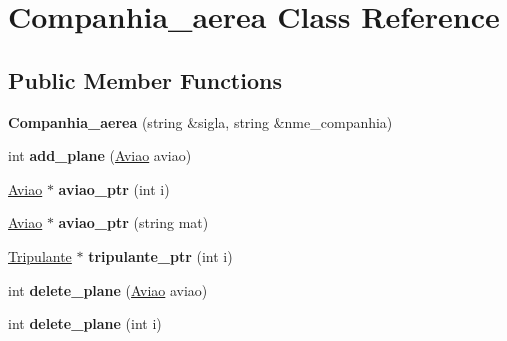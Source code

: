 \hypertarget{class_companhia__aerea}{
\section{Companhia\_\-aerea Class Reference}
\label{class_companhia__aerea}
}
\subsection*{Public Member Functions}
\begin{DoxyCompactItemize}
\item 
\hypertarget{class_companhia__aerea_a0e93c63117e0ee07c3b314e0c9b16b4c}{
{\bfseries Companhia\_\-aerea} (string \&sigla, string \&nme\_\-companhia)}
\label{class_companhia__aerea_a0e93c63117e0ee07c3b314e0c9b16b4c}

\item 
\hypertarget{class_companhia__aerea_accfe05a90387251cacb3c255d6fcb78b}{
int {\bfseries add\_\-plane} (\hyperlink{class_aviao}{Aviao} aviao)}
\label{class_companhia__aerea_accfe05a90387251cacb3c255d6fcb78b}

\item 
\hypertarget{class_companhia__aerea_a2570034f03fbb7f887db82d5c0796b98}{
\hyperlink{class_aviao}{Aviao} $\ast$ {\bfseries aviao\_\-ptr} (int i)}
\label{class_companhia__aerea_a2570034f03fbb7f887db82d5c0796b98}

\item 
\hypertarget{class_companhia__aerea_a18c694809624999601dcb0bcab4d5e38}{
\hyperlink{class_aviao}{Aviao} $\ast$ {\bfseries aviao\_\-ptr} (string mat)}
\label{class_companhia__aerea_a18c694809624999601dcb0bcab4d5e38}

\item 
\hypertarget{class_companhia__aerea_abf9fc74263027ca0ce4fb5aafa64e39b}{
\hyperlink{class_tripulante}{Tripulante} $\ast$ {\bfseries tripulante\_\-ptr} (int i)}
\label{class_companhia__aerea_abf9fc74263027ca0ce4fb5aafa64e39b}

\item 
\hypertarget{class_companhia__aerea_a97d79777856dacfbdf1fdb86850d9920}{
int {\bfseries delete\_\-plane} (\hyperlink{class_aviao}{Aviao} aviao)}
\label{class_companhia__aerea_a97d79777856dacfbdf1fdb86850d9920}

\item 
\hypertarget{class_companhia__aerea_acc44f143ad8af72e368c6ff272a3d55a}{
int {\bfseries delete\_\-plane} (int i)}
\label{class_companhia__aerea_acc44f143ad8af72e368c6ff272a3d55a}


\end{DoxyCompactItemize}
